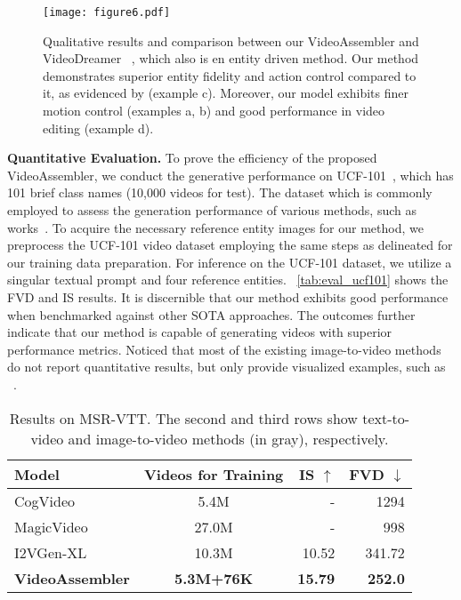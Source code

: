 \begin{figure*}[ht]
\centering
\texttt{[image: figure6.pdf]}
\caption{Qualitative results and comparison between our VideoAssembler and VideoDreamer ~\cite{chen2023videodreamer}, which also is en entity driven method. Our method demonstrates superior entity fidelity and action control compared to it, as evidenced by (example c). Moreover, our model exhibits finer motion control (examples a, b) and good performance in video editing (example d).}
\label{fig: qualitative results}
\end{figure*}

\noindent
\textbf{Quantitative Evaluation.}
To prove the efficiency of the proposed VideoAssembler, we conduct the generative performance on UCF-101~\cite{soomro2012ucf101}, which has 101 brief class names (10,000 videos for test). The dataset which is commonly employed to assess the generation performance of various methods, such as works~\cite{singer2022make, hong2023cogvideo, wang2023videofactory}. To acquire the necessary reference entity images for our method, we preprocess the UCF-101 video dataset employing the same steps as delineated for our training data preparation. For inference on the UCF-101 dataset, we utilize a singular textual prompt and four reference entities. ~\cref{tab:eval_ucf101} shows the FVD and IS results. It is discernible that our method exhibits good performance when benchmarked against other SOTA approaches. The outcomes further indicate that our method is capable of generating videos with superior performance metrics. Noticed that most of the existing image-to-video methods do not report quantitative results, but only provide visualized examples, such as ~\cite{molad2023dreamix, chen2023videocrafter}.

\begin{table}[ht]
    \setlength{\tabcolsep}{1.5mm}
    \centering
    \begin{tabular}{lcrr}
       \toprule
       Model & Videos for Training & IS $\uparrow$ & FVD $\downarrow$ \\
       \midrule
       CogVideo~\cite{hong2023cogvideo} & 5.4M & - & 1294 \\
       MagicVideo~\cite{zhou2022magicvideo} & 27.0M & - & 998 \\
       \midrule
       \rowcolor{gray!20}
       \rowcolor{gray!20}
       I2VGen-XL~\cite{zhang2023i2vgen-xl} & 10.3M & 10.52 & 341.72 \\
       \midrule
       \textbf{VideoAssembler} & \textbf{5.3M+76K} & \textbf{15.79} & \textbf{252.0} \\
       \bottomrule
    \end{tabular}
    \caption{Results on MSR-VTT. The second and third rows show text-to-video and image-to-video methods (in gray), respectively.}
    \label{tab:eval_msrvtt}
\end{table}


